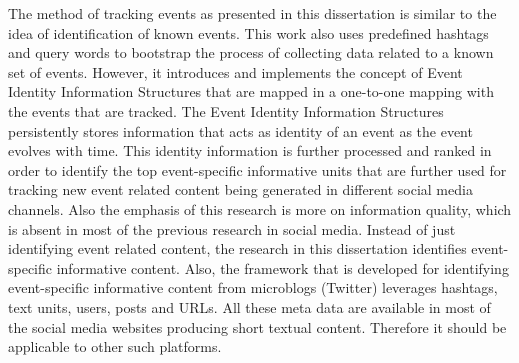 The method of tracking events as presented in this dissertation is similar to the idea of identification of known events. This work also uses predefined hashtags and query words to bootstrap the process of collecting data related to a known set of events. However, it introduces and implements the concept of Event Identity Information Structures that are mapped in a one-to-one mapping with the events that are tracked. The Event Identity Information Structures persistently stores information that acts as identity of an event as the event evolves with time. This identity information is further processed and ranked in order to identify the top event-specific informative units that are further used for tracking new event related content being generated in different social media channels. Also the emphasis of this research is more on information quality, which is absent in most of the previous research in social media. Instead of just identifying event related content, the research in this dissertation identifies event-specific informative content. Also, the framework that is developed for identifying event-specific informative content from microblogs (Twitter) leverages hashtags, text units, users, posts and URLs. All these meta data are available in most of the social media websites producing short textual content. Therefore it should be applicable to other such platforms.










